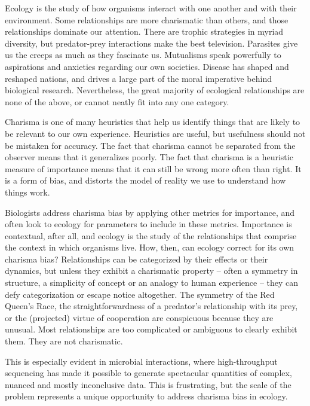 \documentclass[
10pt, %
a4paper, %
oneside, %
headinclude,footinclude, %
BCOR5mm, %
]{scrartcl}
\begin{document}
Ecology is the study of how organisms interact with one another and with their environment. Some relationships are more charismatic than others, and those relationships dominate our attention. There are trophic strategies in myriad diversity, but predator-prey interactions make the best television. Parasites give us the creeps as much as they fascinate us. Mutualisms speak powerfully to aspirations and anxieties regarding our own societies. Disease has shaped and reshaped nations, and drives a large part of the moral imperative behind biological research. Nevertheless, the great majority of ecological relationships are none of the above, or cannot neatly fit into any one category.

Charisma is one of many heuristics that help us identify things that are likely to be relevant to our own experience. Heuristics are useful, but usefulness should not be mistaken for accuracy. The fact that charisma cannot be separated from the observer means that it generalizes poorly. The fact that charisma is a heuristic measure of importance means that it can still be wrong more often than right. It is a form of bias, and distorts the model of reality we use to understand how things work.

Biologists address charisma bias by applying other metrics for importance, and often look to ecology for parameters to include in these metrics. Importance is contextual, after all, and ecology is the study of the relationships that comprise the context in which organisms live. How, then, can ecology correct for its own charisma bias? Relationships can be categorized by their effects or their dynamics, but unless they exhibit a charismatic property -- often a symmetry in structure, a simplicity of concept or an analogy to human experience -- they can defy categorization or escape notice altogether. The symmetry of the Red Queen's Race, the straightforwardness of a predator's relationship with its prey, or the (projected) virtue of cooperation are conspicuous because they are unusual. Most relationships are too complicated or ambiguous to clearly exhibit them. They are not charismatic.





This is especially evident in microbial interactions, where high-throughput sequencing has made it possible to generate spectacular quantities of complex, nuanced and mostly inconclusive data. This is frustrating, but the scale of the problem represents a unique opportunity to address charisma bias in ecology.
\end{document}

